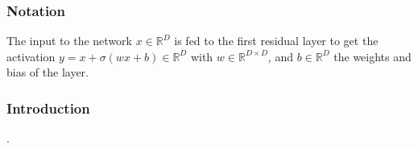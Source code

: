 \documentclass[12pt, article]{article}
\begin{document}
\subsubsection{Notation}
\label{sec:orge8ec75b}





The input to the network \(x \in \mathbb{R}^D\) is fed to the first residual layer
to get the activation \(y = x + \sigma(w x + b) \in \mathbb{R}^D\) with \(w \in
\mathbb{R}^{D \times D}\), and \(b \in \mathbb{R}^D\) the weights and bias of the
layer.
\subsubsection{Introduction}
\label{sec:org1b7d00c}
\parencite{vazquez-canteli19_reinf_learn_deman_respon}.
\end{document}
